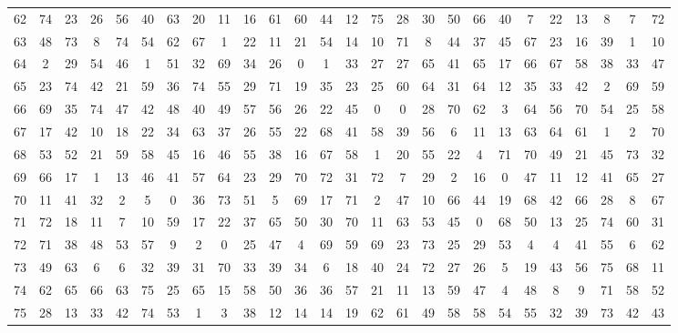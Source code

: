 \begin{table}
\begin{tabular}{c c c c c c c c c c c c c c c c c c c c c c c c c c }
62 & 74 & 23 & 26 & 56 & 40 & 63 & 20 & 11 & 16 & 61 & 60 & 44 & 12 & 75 & 28 & 30 & 50 & 66 & 40 & 7 & 22 & 13 & 8 & 7 & 72 \\
63 & 48 & 73 & 8 & 74 & 54 & 62 & 67 & 1 & 22 & 11 & 21 & 54 & 14 & 10 & 71 & 8 & 44 & 37 & 45 & 67 & 23 & 16 & 39 & 1 & 10 \\
64 & 2 & 29 & 54 & 46 & 1 & 51 & 32 & 69 & 34 & 26 & 0 & 1 & 33 & 27 & 27 & 65 & 41 & 65 & 17 & 66 & 67 & 58 & 38 & 33 & 47 \\
65 & 23 & 74 & 42 & 21 & 59 & 36 & 74 & 55 & 29 & 71 & 19 & 35 & 23 & 25 & 60 & 64 & 31 & 64 & 12 & 35 & 33 & 42 & 2 & 69 & 59 \\
66 & 69 & 35 & 74 & 47 & 42 & 48 & 40 & 49 & 57 & 56 & 26 & 22 & 45 & 0 & 0 & 28 & 70 & 62 & 3 & 64 & 56 & 70 & 54 & 25 & 58 \\
67 & 17 & 42 & 10 & 18 & 22 & 34 & 63 & 37 & 26 & 55 & 22 & 68 & 41 & 58 & 39 & 56 & 6 & 11 & 13 & 63 & 64 & 61 & 1 & 2 & 70 \\
68 & 53 & 52 & 21 & 59 & 58 & 45 & 16 & 46 & 55 & 38 & 16 & 67 & 58 & 1 & 20 & 55 & 22 & 4 & 71 & 70 & 49 & 21 & 45 & 73 & 32 \\
69 & 66 & 17 & 1 & 13 & 46 & 41 & 57 & 64 & 23 & 29 & 70 & 72 & 31 & 72 & 7 & 29 & 2 & 16 & 0 & 47 & 11 & 12 & 41 & 65 & 27 \\
70 & 11 & 41 & 32 & 2 & 5 & 0 & 36 & 73 & 51 & 5 & 69 & 17 & 71 & 2 & 47 & 10 & 66 & 44 & 19 & 68 & 42 & 66 & 28 & 8 & 67 \\
71 & 72 & 18 & 11 & 7 & 10 & 59 & 17 & 22 & 37 & 65 & 50 & 30 & 70 & 11 & 63 & 53 & 45 & 0 & 68 & 50 & 13 & 25 & 74 & 60 & 31 \\
72 & 71 & 38 & 48 & 53 & 57 & 9 & 2 & 0 & 25 & 47 & 4 & 69 & 59 & 69 & 23 & 73 & 25 & 29 & 53 & 4 & 4 & 41 & 55 & 6 & 62 \\
73 & 49 & 63 & 6 & 6 & 32 & 39 & 31 & 70 & 33 & 39 & 34 & 6 & 18 & 40 & 24 & 72 & 27 & 26 & 5 & 19 & 43 & 56 & 75 & 68 & 11 \\
74 & 62 & 65 & 66 & 63 & 75 & 25 & 65 & 15 & 58 & 50 & 36 & 36 & 57 & 21 & 11 & 13 & 59 & 47 & 4 & 48 & 8 & 9 & 71 & 58 & 52 \\
75 & 28 & 13 & 33 & 42 & 74 & 53 & 1 & 3 & 38 & 12 & 14 & 14 & 19 & 62 & 61 & 49 & 58 & 58 & 54 & 55 & 32 & 39 & 73 & 42 & 43 \\
\hline
\end{tabular}
\end{table}